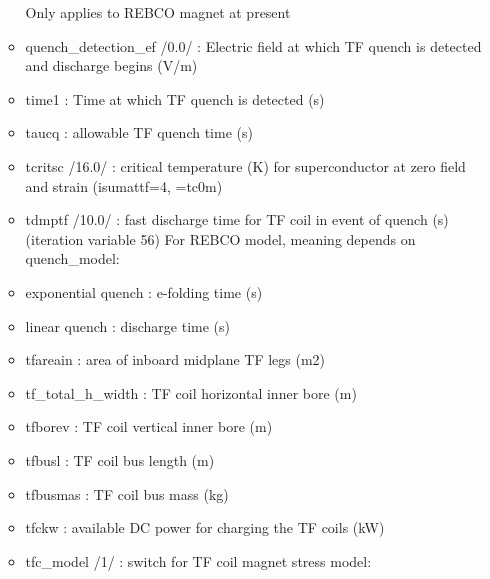 \documentclass[]{article}
\begin{document}
\begin{itemize}
\begin{itemize}
    Only applies to REBCO magnet at present
  \item
    quench\_detection\_ef /0.0/ : Electric field at which TF quench is
    detected and discharge begins (V/m)
  \item
    time1 : Time at which TF quench is detected (s)
  \item
    taucq : allowable TF quench time (s)
  \item
    tcritsc /16.0/ : critical temperature (K) for superconductor at zero
    field and strain (isumattf=4, =tc0m)
  \item
    tdmptf /10.0/ : fast discharge time for TF coil in event of quench
    (s) (iteration variable 56) For REBCO model, meaning depends on
    quench\_model:
  \item
    exponential quench : e-folding time (s)
  \item
    linear quench : discharge time (s)
  \item
    tfareain : area of inboard midplane TF legs (m2)
  \item
    tf_total_h_width : TF coil horizontal inner bore (m)
  \item
    tfborev : TF coil vertical inner bore (m)
  \item
    tfbusl : TF coil bus length (m)
  \item
    tfbusmas : TF coil bus mass (kg)
  \item
    tfckw : available DC power for charging the TF coils (kW)
  \item
    tfc\_model /1/ : switch for TF coil magnet stress model:


\end{itemize}
\end{itemize}
\end{document}
